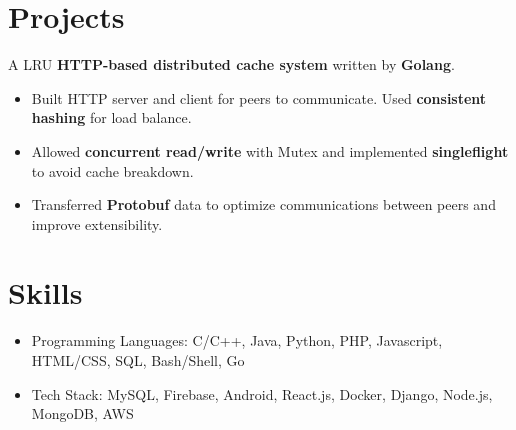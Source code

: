 \documentclass{resume}
\begin{document}
\section{Projects}
  A LRU \textbf{HTTP-based distributed cache system} written by \textbf{Golang}.
\begin{itemize}
  \item Built HTTP server and client for peers to communicate. Used \textbf{consistent hashing} for load balance.
  \item Allowed \textbf{concurrent read/write} with Mutex and implemented \textbf{singleflight} to avoid cache breakdown.
  \item Transferred \textbf{Protobuf} data to optimize communications between peers and improve extensibility.
\end{itemize}

\section{Skills}
\begin{itemize}[parsep=0.5ex]
  \item Programming Languages: C/C++, Java, Python, PHP, Javascript, HTML/CSS, SQL, Bash/Shell, Go
  \item Tech Stack: MySQL, Firebase, Android, React.js, Docker, Django, Node.js, MongoDB, AWS
\end{itemize}
\end{document}
